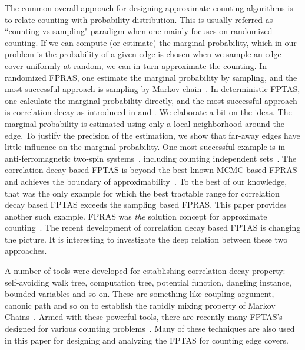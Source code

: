 The common overall approach for designing approximate counting algorithms is to relate counting with probability distribution.
 This is usually referred as ``counting vs sampling" paradigm when one mainly focuses on randomized counting.  If we can compute (or estimate) the marginal probability, which in our problem is the probability of a given edge is chosen when we sample an edge cover uniformly at random, we can in turn approximate  the counting. In randomized FPRAS, one estimate the marginal probability by sampling, and the most successful approach is sampling by Markov chain~\cite{MC_JA96}.
In deterministic FPTAS, one calculate the marginal probability directly, and the most successful approach is correlation decay as introduced in \cite{BG08} and \cite{Weitz06}. We elaborate a bit on the ideas.
 The marginal probability is estimated using only a local neighborhood around the edge. To justify the precision of the estimation, we show that far-away edges have little influence on the marginal probability.
One most successful example is in anti-ferromagnetic two-spin systems~\cite{LLY12,SST,LLY13}, including counting independent sets~\cite{Weitz06}. The correlation decay based FPTAS is beyond the best known MCMC based FPRAS and achieves the boundary of approximability~\cite{SS12,galanis2012inapproximability}.
To the best of our knowledge, that was the only example for which the best tractable range for correlation decay based FPTAS exceeds the sampling based FPRAS. This paper provides another such example. FPRAS was \emph{the} solution concept for approximate counting~\cite{dich_DGGJ00}. The recent development of correlation decay based FPTAS is changing the picture. It is interesting to investigate the deep relation between these two approaches.

A number of tools were developed for establishing correlation decay property: self-avoiding walk tree, computation tree, potential function, dangling instance, bounded variables and so on. These are something like coupling argument, canonic path and so on to establish the rapidly mixing property of Markov Chains~\cite{MC_JA96}.
Armed with these powerful tools, there are recently many FPTAS's designed for various counting problems~\cite{LLY12,SST,LLY13,YZ13,fibo-approx}.
Many of these techniques are also used in this paper for designing and analyzing the FPTAS for counting edge covers.

